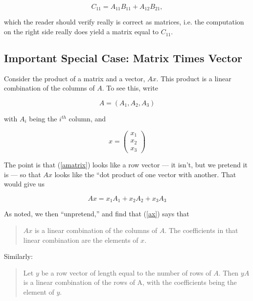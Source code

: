 \begin{equation}
C_{11} = A_{11} B_{11} + A_{12} B_{21}, 
\end{equation}

which the reader should verify really is correct as matrices, i.e. the
computation on the right side really does yield a matrix equal to $C_{11}$.

\subsection{Important Special Case:  Matrix Times Vector}

Consider the product of a matrix and a vector, $Ax$.  This product is a
linear combination of the columns of $A$.  To see this, write

\begin{equation}
\label{amatrix}
A = (A_1, A_2, A_3)
\end{equation}

with $A_i$ being the $i^{th}$ column, and

\begin{equation}
x = 
\left ( 
\begin{array}{c}
x_1 \\
x_2 \\
x_3
\end{array}
\right )
\end{equation}

The point is that (\ref{amatrix}) looks like a row vector --- it isn't,
but we pretend it is --- so that $Ax$ looks like the ``dot product of
one vector with another.  That would give us

\begin{equation}
\label{ax}
Ax = x_1 A_1 + x_2 A_2 + x_3 A_3
\end{equation}

As noted, we then ``unpretend,'' and find that (\ref{ax}) says that

\begin{quote}
$Ax$ is a linear combination of the columns of $A$.  The coefficients in
that linear combination are the elements of $x$.
\end{quote}

Similarly:

\begin{quote}
Let $y$ be a row vector of length equal to the number of rows of $A$.
Then $yA$ is a linear combination of the rows of A, with the
coefficients being the element of $y$.
\end{quote}

